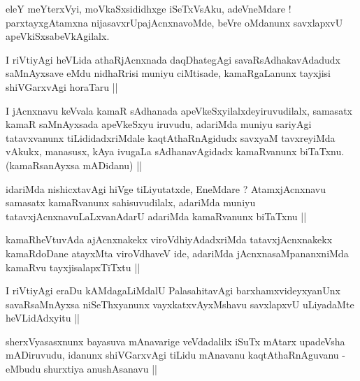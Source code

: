 
\begin{artha}
eleY meYterxVyi, moVkaSxsididhxge iSeTxVsAku, adeVneMdare ! parxtayxgAtamxna nijasavxrUpajAcnxnavoMde, beVre oMdanunx savxlapxvU apeVkiSxsabeVkAgilalx.
\end{artha}


\begin{artha}
I riVtiyAgi heVLida athaRjAcnxnada daqDhategAgi savaRsAdhakavAdadudx saMnAyxsave eMdu nidhaRrisi muniyu ciMtisade, kamaRgaLanunx tayxjisi shiVGarxvAgi horaTaru ||
\end{artha}


\begin{artha}
I jAcnxnavu keVvala kamaR sAdhanada apeVkeSxyilalxdeyiruvudilalx, samasatx kamaR saMnAyxsada apeVkeSxyu iruvudu, adariMda muniyu sariyAgi tatavxvanunx tiLididadxriMdale kaqtAthaRnAgidudx savxyaM tavxreyiMda vAkukx, manasusx, kAya ivugaLa sAdhanavAgidadx kamaRvanunx biTaTxnu. (kamaRsanAyxsa mADidanu) ||
\end{artha}


\begin{artha}
idariMda nishicxtavAgi hiVge tiLiyutatxde, EneMdare ? AtamxjAcnxnavu samasatx kamaRvanunx sahisuvudilalx, adariMda muniyu tatavxjAcnxnavuLaLxvanAdarU adariMda kamaRvanunx biTaTxnu ||
\end{artha}


\begin{artha}
kamaRheVtuvAda ajAcnxnakekx viroVdhiyAdadxriMda tatavxjAcnxnakekx kamaRdoDane atayxMta viroVdhaveV ide, adariMda jAcnxnasaMpananxniMda kamaRvu tayxjisalapxTiTxtu ||
\end{artha}

\begin{artha}
I riVtiyAgi eraDu kAMdagaLiMdalU PalasahitavAgi barxhamxvideyxyanUnx savaRsaMnAyxsa niSeThxyanunx vayxkatxvAyxMshavu savxlapxvU uLiyadaMte heVLidAdxyitu ||
\end{artha}

\begin{artha}
sherxVyasasxnunx bayasuva mAnavarige veVdadalilx iSuTx mAtarx upadeVsha mADiruvudu, idanunx shiVGarxvAgi tiLidu mAnavanu kaqtAthaRnAguvanu - eMbudu shurxtiya anushAsanavu ||
\end{artha}

